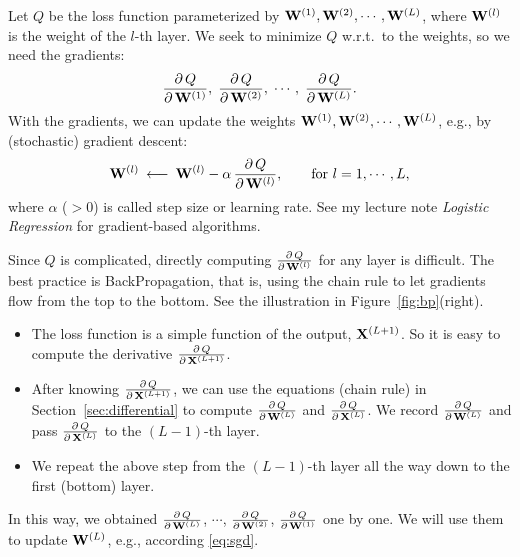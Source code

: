 \documentclass[11pt]{article}
\numberwithin{equation}{section}
\def\W{{\bf W}}
\def\X{{\bf X}}
\begin{document}
Let $Q$ be the loss function parameterized by $\W^{(1)}, \W^{(2)}, \cdots , \W^{(L)}$, where $\W^{(l)}$ is the weight of the $l$-th layer.
We seek to minimize $Q$ w.r.t.\ to the weights, so we need the gradients:
\begin{equation*}
    \frac{ \partial \, Q }{ \partial \, \W^{(1)} } , \; 
    \frac{ \partial \, Q }{ \partial \, \W^{(2)} } , \; \cdots , \;
    \frac{ \partial \, Q }{ \partial \, \W^{(L)} } .
\end{equation*}
With the gradients, we can update the weights $\W^{(1)}, \W^{(2)}, \cdots , \W^{(L)}$, e.g., by (stochastic) gradient descent:
\begin{equation} \label{eq:sgd}
    \W^{(l)} \: \longleftarrow \: \W^{(l)} - \alpha \, \frac{ \partial \, Q }{ \partial \, \W^{(l)} },
    \qquad \textrm{for } l=1, \cdots , L,
\end{equation}
where $\alpha$ ($>0$) is called step size or learning rate.
See my lecture note {\it Logistic Regression} for gradient-based algorithms.


Since $Q$ is complicated, directly computing $\frac{ \partial \, Q }{ \partial \, \W^{(l)} } $ for any layer is difficult.
The best practice is BackPropagation, that is, using the chain rule to let gradients flow from the top to the bottom.
See the illustration in Figure~\ref{fig:bp}(right).
\begin{itemize}
    \item 
    The loss function is a simple function of the output, $\X^{(L+1)}$.
    So it is easy to compute the derivative $\frac{\partial \, Q}{ \partial \, \X^{(L+1)}}$.
    \item
    After knowing $\frac{\partial \, Q}{ \partial \, \X^{(L+1)}}$, we can use the equations (chain rule) in Section~\ref{sec:differential} to compute 
    $\frac{\partial \, Q}{ \partial \, \W^{(L)}}$ and $\frac{\partial \, Q}{ \partial \, \X^{(L)}}$.
    We record $\frac{\partial \, Q}{ \partial \, \W^{(L)}}$ and pass $\frac{\partial \, Q}{ \partial \, \X^{(L)}}$ to the $(L-1)$-th layer.
    \item
    We repeat the above step from the $(L-1)$-th layer all the way down to the first (bottom) layer.
\end{itemize}
In this way, we obtained $\frac{ \partial \, Q }{ \partial \, \W^{(L)} } $, $\cdots$, $\frac{ \partial \, Q }{ \partial \, \W^{(2)} } $, $\frac{ \partial \, Q }{ \partial \, \W^{(1)} } $ one by one.
We will use them to update $\W^{(L)}$, e.g., according \eqref{eq:sgd}.
\end{document}
